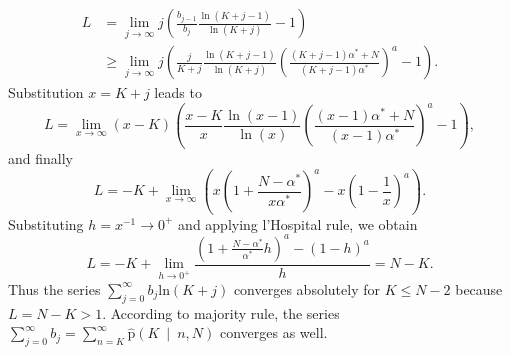 \begin{equation}
\begin{split}
L & = \lim_{j \to \infty} j \left( \frac{b_{j-1}}{b_{j}} \frac{\ln(K+j-1)}{\ln(K+j)}   - 1   \right) \\ 
& \geq \lim_{j \to \infty} j \left( \frac{j}{K+j} \frac{\ln(K+j-1)}{\ln(K+j)} {\left( \frac{(K+j-1)\alpha^* + N}{(K+j-1)\alpha^* } \right)}^{a} - 1   \right).
\end{split}
\end{equation}
Substitution $x=K+j$ leads to
\begin{equation}
L = \lim_{x \to \infty} (x-K)  \left( \frac{x-K}{x} \frac{\ln(x-1)}{\ln(x)} {\left( \frac{(x-1)\alpha^* + N}{(x-1)\alpha^*} \right)}^{a} - 1   \right),
\end{equation}
and finally
\begin{equation}
L = -K + \lim_{x \to \infty} \left( x{\left( 1 + \frac{N-\alpha^{*}}{x\alpha^{*}} \right)}^{a} -x{\left( 1 - \frac{1}{x} \right)}^{a} \right).
\end{equation}
Substituting $h = x^{-1} \to 0^{+}$ and applying l'Hospital rule, we obtain
\begin{equation}
L = -K + \lim_{h \to 0^{+}} \frac{ \left( 1+\frac{N-\alpha^{*}}{\alpha^{*}}h \right)^{a} - {(1-h)}^{a}}{h}  = N-K.
\end{equation}
Thus the series $\sum_{j=0}^{\infty}{b_j \mathrm{ln}(K+j)} $ converges absolutely for  $K \leq N-2$ because $L = N-K > 1$.
According to majority rule, the series $\sum_{j=0}^{\infty}{b_j} = \sum_{n=K}^{\infty}{\mathrm{\hat{p}}\left(K \: \middle| \: n,N\right)}$ converges as well.